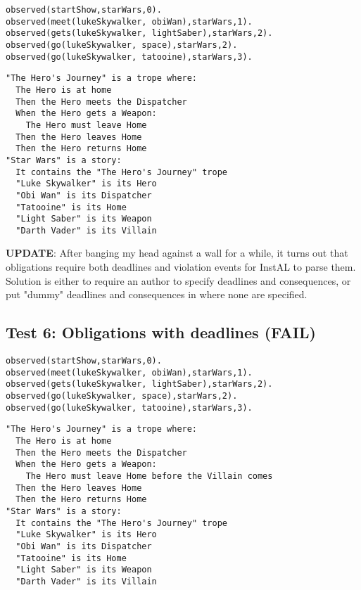 \documentclass[11pt]{article}
\begin{document}
\begin{verbatim}
observed(startShow,starWars,0).
observed(meet(lukeSkywalker, obiWan),starWars,1).
observed(gets(lukeSkywalker, lightSaber),starWars,2).
observed(go(lukeSkywalker, space),starWars,2).
observed(go(lukeSkywalker, tatooine),starWars,3).
\end{verbatim}

\begin{verbatim}
"The Hero's Journey" is a trope where:
  The Hero is at home
  Then the Hero meets the Dispatcher
  When the Hero gets a Weapon:
    The Hero must leave Home
  Then the Hero leaves Home
  Then the Hero returns Home
"Star Wars" is a story:
  It contains the "The Hero's Journey" trope
  "Luke Skywalker" is its Hero
  "Obi Wan" is its Dispatcher
  "Tatooine" is its Home
  "Light Saber" is its Weapon
  "Darth Vader" is its Villain
\end{verbatim}

\textbf{UPDATE}: After banging my head against a wall for a while, it turns out that obligations require both deadlines and violation events for InstAL to parse them. Solution is either to require an author to specify deadlines and consequences, or put "dummy" deadlines and consequences in where none are specified.

\subsection{Test 6: Obligations with deadlines (FAIL)}
\label{sec:orgheadline6}

\begin{verbatim}
observed(startShow,starWars,0).
observed(meet(lukeSkywalker, obiWan),starWars,1).
observed(gets(lukeSkywalker, lightSaber),starWars,2).
observed(go(lukeSkywalker, space),starWars,2).
observed(go(lukeSkywalker, tatooine),starWars,3).
\end{verbatim}

\begin{verbatim}
"The Hero's Journey" is a trope where:
  The Hero is at home
  Then the Hero meets the Dispatcher
  When the Hero gets a Weapon:
    The Hero must leave Home before the Villain comes
  Then the Hero leaves Home
  Then the Hero returns Home
"Star Wars" is a story:
  It contains the "The Hero's Journey" trope
  "Luke Skywalker" is its Hero
  "Obi Wan" is its Dispatcher
  "Tatooine" is its Home
  "Light Saber" is its Weapon
  "Darth Vader" is its Villain
\end{verbatim}
\end{document}
